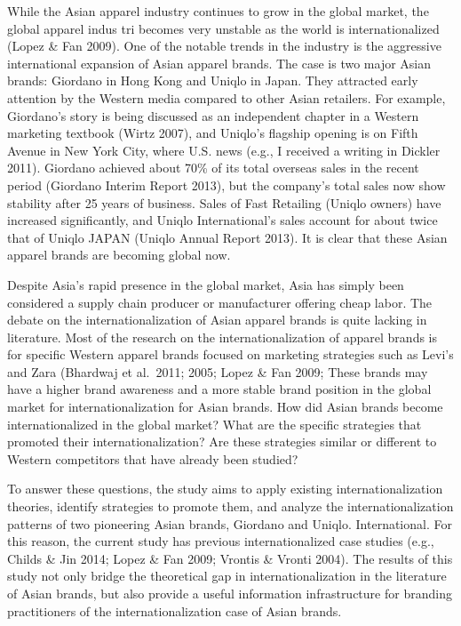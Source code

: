 \documentclass[12pt,a4paper]{article}
\begin{document}
While the Asian apparel industry continues to grow in the global market,
the global apparel indus tri becomes very unstable as the world is
internationalized (Lopez \& Fan 2009). One of the notable trends in the
industry is the aggressive international expansion of Asian apparel
brands. The case is two major Asian brands: Giordano in Hong Kong and
Uniqlo in Japan. They attracted early attention by the Western media
compared to other Asian retailers. For example, Giordano's story is
being discussed as an independent chapter in a Western marketing
textbook (Wirtz 2007), and Uniqlo's flagship opening is on Fifth Avenue
in New York City, where U.S. news (e.g., I received a writing in Dickler
2011). Giordano achieved about 70\% of its total overseas sales in the
recent period (Giordano Interim Report 2013), but the company's total
sales now show stability after 25 years of business. Sales of Fast
Retailing (Uniqlo owners) have increased significantly, and Uniqlo
International's sales account for about twice that of Uniqlo JAPAN
(Uniqlo Annual Report 2013). It is clear that these Asian apparel brands
are becoming global now.

Despite Asia's rapid presence in the global market, Asia has simply been
considered a supply chain producer or manufacturer offering cheap labor.
The debate on the internationalization of Asian apparel brands is quite
lacking in literature. Most of the research on the internationalization
of apparel brands is for specific Western apparel brands focused on
marketing strategies such as Levi's and Zara (Bhardwaj et al.~2011;
2005; Lopez \& Fan 2009; These brands may have a higher brand awareness
and a more stable brand position in the global market for
internationalization for Asian brands. How did Asian brands become
internationalized in the global market? What are the specific strategies
that promoted their internationalization? Are these strategies similar
or different to Western competitors that have already been studied?

To answer these questions, the study aims to apply existing
internationalization theories, identify strategies to promote them, and
analyze the internationalization patterns of two pioneering Asian
brands, Giordano and Uniqlo. International. For this reason, the current
study has previous internationalized case studies (e.g., Childs \& Jin
2014; Lopez \& Fan 2009; Vrontis \& Vronti 2004). The results of this
study not only bridge the theoretical gap in internationalization in the
literature of Asian brands, but also provide a useful information
infrastructure for branding practitioners of the internationalization
case of Asian brands.
\end{document}
